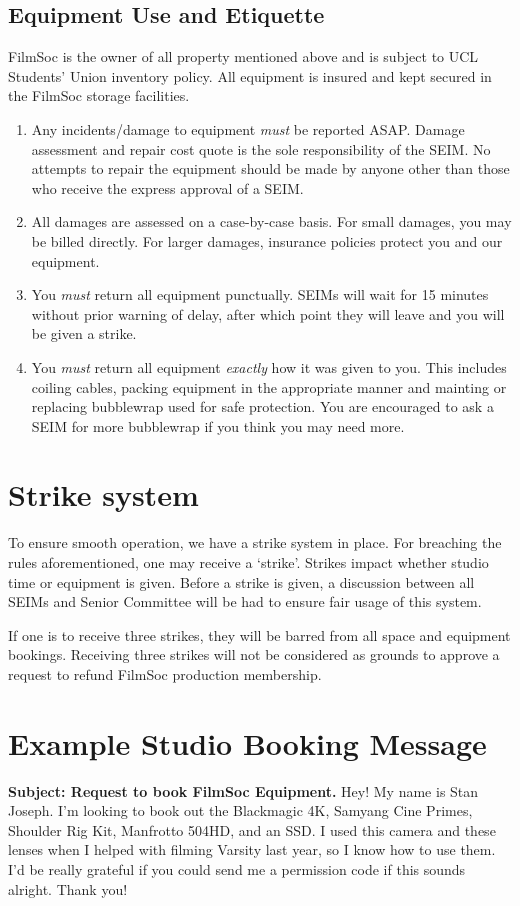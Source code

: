 \documentclass[]{article}
\begin{document}
\subsection{Equipment Use and Etiquette}
FilmSoc is the owner of all property mentioned above and is subject to UCL Students' Union inventory policy. All equipment is insured and kept secured in the FilmSoc storage facilities.
\begin{enumerate}
    \item Any incidents/damage to equipment \textit{must} be reported ASAP. Damage assessment and repair cost quote is the sole responsibility of the SEIM. No attempts to repair the equipment should be made by anyone other than those who receive the express approval of a SEIM.
    \item All damages are assessed on a case-by-case basis. For small damages, you may be billed directly. For larger damages, insurance policies protect you and our equipment.
    \item You \textit{must} return all equipment punctually. SEIMs will wait for 15 minutes without prior warning of delay, after which point they will leave and you will be given a strike.
    \item You \textit{must} return all equipment \textit{exactly} how it was given to you. This includes coiling cables, packing equipment in the appropriate manner and mainting or replacing bubblewrap used for safe protection. You are encouraged to ask a SEIM for more bubblewrap if you think you may need more.
\end{enumerate}
\section{Strike system}\label{strikeSystem}
To ensure smooth operation, we have a strike system in place. For breaching the rules aforementioned, one may receive a `strike'. Strikes impact whether studio time or equipment is given. Before a strike is given, a discussion between all SEIMs and Senior Committee will be had to ensure fair usage of this system.

If one is to receive three strikes, they will be barred from all space and equipment bookings. Receiving three strikes will not be considered as grounds to approve a request to refund FilmSoc production membership.
\appendix
\section{Example Studio Booking Message}\label{studioForm}
\begin{framed}
    \noindent \textbf{Subject: Request to book FilmSoc Equipment.} \newline
    \newline
    \noindent
    Hey! My name is Stan Joseph. I'm looking to book out the Blackmagic 4K, Samyang Cine Primes, Shoulder Rig Kit, Manfrotto 504HD, and an SSD. I used this camera and these lenses when I helped with filming Varsity last year, so I know how to use them. I'd be really grateful if you could send me a permission code if this sounds alright. Thank you!
\end{framed}
\end{document}
